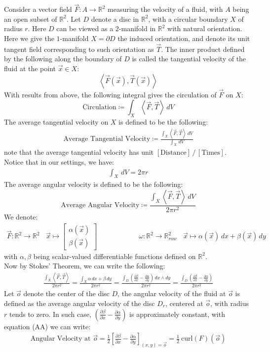 \documentclass[15pt]{book}
\theoremstyle{break}
\theoremstyle{break}
\newcommand{\R}{\mathbb{R}}
\newcommand{\pd}{\partial}
\newcommand{\bmat}[1]{\begin{bmatrix} #1 \end{bmatrix}}
\begin{document}
Consider a vector field $\vec{F}:A \to \R^2$  measuring the velocity of a fluid, with $A$ being an open subset of $\R^2$. Let $D$ denote a disc in $\R^2$, with a circular boundary $X$ of radius $r$. Here $D$ can be viewed as a $2$-manifold in $\R^2$ with natural orientation. Here we give the $1$-manifold $X=\partial D$ the induced orientation, and denote its unit tangent field corresponding to such orientation as $\vec{T}$. The inner product defined by the following along the boundary of $D$ is called the tangential velocity of the fluid at the point $\vec{x}\in X$: 
$$\left<\vec{F}(\vec{x}), \vec{T}(\vec{x})\right>$$  
With results from above, the following integral gives the circulation of $\vec{F}$ on $X$:
$$\text{Circulation} \coloneqq \int_X \left< \vec{F}, \vec{T}\right>\, dV$$
The average tangential velocity on $X$ is defined to be the following:
\begin{align*}
\text{Average Tangential Velocity} \coloneqq \frac{\int_X \left< \vec{F},\vec{T}\right> \, dV}{\int_X \, dV} 
\end{align*}
note that the average tangential velocity has unit $[\text{Distance}]\,/\,[\text{Times}]$. \\Notice that in our settings, we have:
\begin{align*}
\int_X \, dV = 2\pi r
\end{align*}
The average angular velocity is defined to be the following:
$$\text{Average Angular Velocity} \coloneqq \frac{\int_X \left< \vec{F}, \vec{T}\right>\, dV}{ 2\pi r^2}$$
We denote:
\begin{align*}
\vec{F}:\R^2 \to \R^2 \ \ \ \ \vec{x}\mapsto \bmat{\alpha(\vec{x})\\ \beta(\vec{x})}\qquad\qquad\qquad \omega:\R^2\to \R^2_{row} \ \ \ \ \vec{x}\mapsto \alpha(\vec{x})\, dx +\beta(\vec{x}) \, dy
\end{align*}
with $\alpha,\beta$ being scalar-valued differentiable functions defined on $\R^2$. \\
Now by Stokes' Theorem, we can write the following:
\begin{align*}
\frac{\int_X \left< \vec{F}, \vec{T}\right>}{ 2\pi r^2} = \frac{\int_X \alpha\, dx + \beta\, dy}{2\pi r^2} = \frac{\int_D \left(\frac{\pd \beta}{\pd x}- \frac{\pd \alpha}{\pd y}\right)\, dx\wedge dy}{2\pi r^2} = \frac{\int_{D} \left(\frac{\pd \beta}{\pd x}- \frac{\pd \alpha}{\pd y}\right)}{2\pi r^2}  \tag{AA}
\end{align*}
Let $\vec{o}$ denote the center of the disc $D$, the angular velocity of the fluid at $\vec{o}$ is defined as the average angular velocity of the disc $D_r$, centered at $\vec{o}$, with radius $r$ tends to zero. In such case, $(\frac{\pd \beta}{\pd x}- \frac{\pd \alpha}{\pd y})$ is approximately constant, with equation (AA) we can write:
\begin{align*}
\text{Angular Velocity at }\vec{o} = \frac{1}{2} \left[\frac{\pd \beta}{\pd x}- \frac{\pd \alpha}{\pd y}\right]_{(x,y) = \vec{o}} = \frac{1}{2}\ \text{curl}(F)(\vec{o})
\end{align*}
\end{document}
